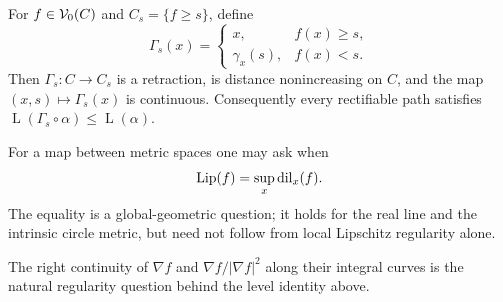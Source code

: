 \begin{theorem}
\label{thm:chow-iii-h59-sharafutdinov-retraction}

For $f\in\mathcal V_0(C)$ and $C_s=\{f\ge s\}$, define
\[
\Gamma_s(x)=
\begin{cases}x,&f(x)\ge s,\\ \gamma_x(s),&f(x)<s.\end{cases}
\]
Then $\Gamma_s:C\to C_s$ is a retraction, is distance nonincreasing on $C$,
and the map $(x,s)\mapsto\Gamma_s(x)$ is continuous.  Consequently every rectifiable
path satisfies $\operatorname{L}(\Gamma_s\circ\alpha)\le\operatorname{L}(\alpha)$.
\end{theorem}

\begin{remark}
\label{rem:chow-iii-h1-lipschitz-question}
For a map between metric spaces one may ask when
\[
\operatorname{Lip}(f)=\sup_{x}\operatorname{dil}_x(f).
\]
The equality is a global-geometric question; it holds for the real line and the
intrinsic circle metric, but need not follow from local Lipschitz regularity alone.
\end{remark}

\begin{remark}
\label{rem:chow-iii-h46-right-continuity-problem}
The right continuity of $\nabla f$ and $\nabla f/|\nabla f|^2$ along their integral curves
is the natural regularity question behind the level identity above.
\end{remark}
